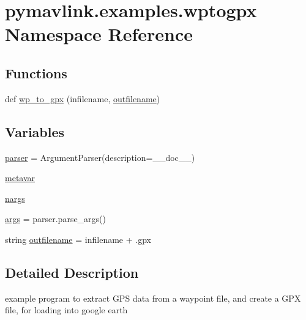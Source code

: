 \hypertarget{namespacepymavlink_1_1examples_1_1wptogpx}{}\section{pymavlink.\+examples.\+wptogpx Namespace Reference}
\label{namespacepymavlink_1_1examples_1_1wptogpx}
\subsection*{Functions}
\begin{DoxyCompactItemize}
\item 
def \mbox{\hyperlink{namespacepymavlink_1_1examples_1_1wptogpx_a1e2a92ba9dc9c4b0facc6734a2b8baa3}{wp\+\_\+to\+\_\+gpx}} (infilename, \mbox{\hyperlink{namespacepymavlink_1_1examples_1_1wptogpx_a88358ed94e434e7d6a7b835f2c5ccf70}{outfilename}})
\end{DoxyCompactItemize}
\subsection*{Variables}
\begin{DoxyCompactItemize}
\item 
\mbox{\hyperlink{namespacepymavlink_1_1examples_1_1wptogpx_aa1800996bbadaa4ce742a88d9c7b9c38}{parser}} = Argument\+Parser(description=\+\_\+\+\_\+doc\+\_\+\+\_\+)
\item 
\mbox{\hyperlink{namespacepymavlink_1_1examples_1_1wptogpx_a7b1acf0b2ee3b73eb9364fc241d62de9}{metavar}}
\item 
\mbox{\hyperlink{namespacepymavlink_1_1examples_1_1wptogpx_a18e53d182196efcc641b9a08e31e5515}{nargs}}
\item 
\mbox{\hyperlink{namespacepymavlink_1_1examples_1_1wptogpx_a7758427a51641f17350ed66c2a9948dc}{args}} = parser.\+parse\+\_\+args()
\item 
string \mbox{\hyperlink{namespacepymavlink_1_1examples_1_1wptogpx_a88358ed94e434e7d6a7b835f2c5ccf70}{outfilename}} = infilename + \textquotesingle{}.gpx\textquotesingle{}
\end{DoxyCompactItemize}


\subsection{Detailed Description}
\begin{DoxyVerb}example program to extract GPS data from a waypoint file, and create a GPX
file, for loading into google earth
\end{DoxyVerb}
 

